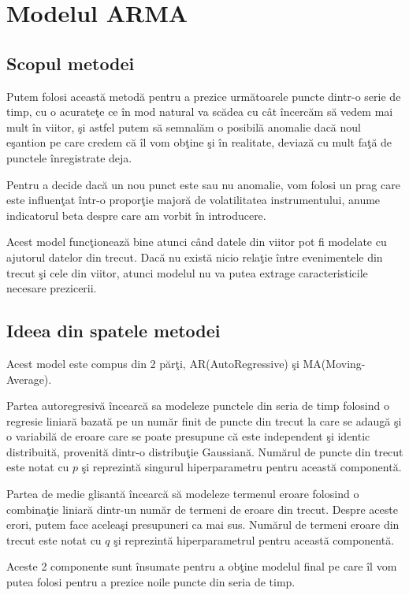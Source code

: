 \chapter{Modelul ARMA}

\section{Scopul metodei}

Putem folosi această metodă pentru a prezice următoarele puncte dintr-o serie de timp, cu o acurateţe ce în mod natural va scădea
cu cât încercăm să vedem mai mult în viitor, şi astfel putem să semnalăm o posibilă anomalie dacă noul eşantion pe care credem că îl vom obţine şi în realitate, deviază cu mult faţă de punctele înregistrate deja.

Pentru a decide dacă un nou punct este sau nu anomalie, vom folosi un prag care este influenţat într-o proporţie majoră de volatilitatea instrumentului, anume indicatorul beta despre care am vorbit în 
introducere.

Acest model funcţionează bine atunci când datele din viitor pot fi modelate cu ajutorul datelor din trecut. Dacă nu există nicio relaţie între
evenimentele din trecut şi cele din viitor, atunci modelul nu va putea extrage caracteristicile necesare prezicerii.

\section{Ideea din spatele metodei}

Acest model este compus din 2 părţi, AR(AutoRegressive) şi MA(Moving-Average).

Partea autoregresivă încearcă sa modeleze punctele din seria de timp folosind o regresie liniară bazată pe un număr finit de puncte din trecut
la care se adaugă şi o variabilă de eroare care se poate presupune că este independent şi identic distribuită, provenită dintr-o distribuţie Gaussiană. Numărul de puncte din trecut este notat cu $p$ şi reprezintă singurul hiperparametru pentru această componentă.

Partea de medie glisantă încearcă să modeleze termenul eroare folosind o combinaţie liniară dintr-un număr de termeni de eroare din trecut. Despre aceste erori, putem face aceleaşi presupuneri ca mai sus. Numărul de termeni eroare din trecut este notat cu $q$ şi reprezintă
hiperparametrul pentru această componentă.

Aceste 2 componente sunt însumate pentru a obţine modelul final pe care îl vom putea folosi pentru a prezice noile puncte din seria de timp.

